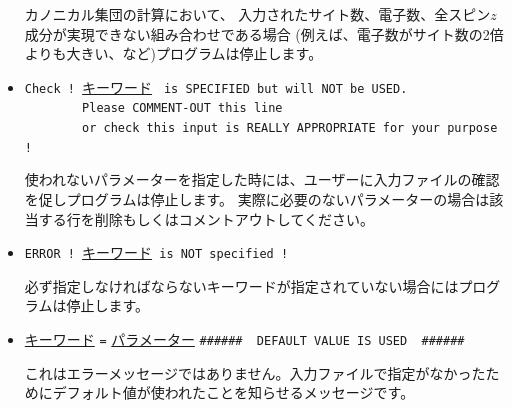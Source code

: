 \begin{itemize}
カノニカル集団の計算において、
入力されたサイト数、電子数、全スピン$z$成分が実現できない組み合わせである場合
(例えば、電子数がサイト数の2倍よりも大きい、など)プログラムは停止します。

\item \verb|Check ! |\underline{キーワード} \verb| is SPECIFIED but will NOT be USED.|\\
      \verb|        Please COMMENT-OUT this line|\\
      \verb|        or check this input is REALLY APPROPRIATE for your purpose !|

使われないパラメーターを指定した時には、ユーザーに入力ファイルの確認を促しプログラムは停止します。
実際に必要のないパラメーターの場合は該当する行を削除もしくはコメントアウトしてください。

\item \verb|ERROR ! |\underline{キーワード}\verb| is NOT specified !|

必ず指定しなければならないキーワードが指定されていない場合にはプログラムは停止します。

\item \underline{キーワード} \verb|=| \underline{パラメーター} \verb|######  DEFAULT VALUE IS USED  ######|

これはエラーメッセージではありません。入力ファイルで指定がなかったためにデフォルト値が使われたことを知らせるメッセージです。

\end{itemize}

 
 
